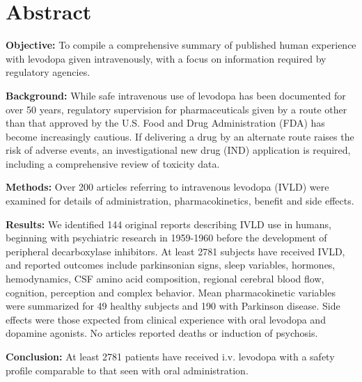 \section{Abstract}
\textbf{Objective:} To compile a comprehensive summary of published human experience with levodopa given intravenously, with a focus on information required by regulatory agencies.

\textbf{Background:} While safe intravenous use of levodopa has been documented for over 50 years, regulatory supervision for pharmaceuticals given by a route other than that approved by the U.S. Food and Drug Administration (FDA) has become increasingly cautious. If delivering a drug by an alternate route raises the risk of adverse events, an investigational new drug (IND) application is required, including a comprehensive review of toxicity data.

\textbf{Methods:} Over 200 articles referring to intravenous levodopa (IVLD) were examined for details of administration, pharmacokinetics, benefit and side effects.

\textbf{Results:} We identified 144 original reports describing IVLD use in humans, beginning with psychiatric research in 1959-1960 before the development of peripheral decarboxylase inhibitors. At least 2781 subjects have received IVLD, and reported outcomes include parkinsonian signs, sleep variables, hormones, hemodynamics, CSF amino acid composition, regional cerebral blood ﬂow, cognition, perception and complex behavior. Mean pharmacokinetic variables were summarized for 49 healthy subjects and 190 with Parkinson disease. Side effects were those expected from clinical experience with oral levodopa and dopamine agonists. No articles reported deaths or induction of psychosis.

\textbf{Conclusion:} At least 2781 patients have received i.v. levodopa with a safety profile comparable to that seen with oral administration.